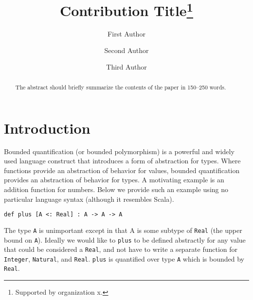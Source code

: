 \documentclass[runningheads]{llncs}
\begin{document}
%
\title{Contribution Title\thanks{Supported by organization x.}}
%
%
\author{First Author \and
Second Author \and
Third Author}
%
%
%
\maketitle              %
%
\begin{abstract}
The abstract should briefly summarize the contents of the paper in
150--250 words.

\end{abstract}

\section{Introduction}
\label{s:intro}

Bounded quantification (or bounded polymorphism) is a powerful and widely used language construct that introduces a form of 
abstraction for types. Where functions provide an abstraction of behavior for values, bounded quantification 
provides an abstraction of behavior for types. A motivating example is an addition function for numbers. Below we
provide such an example using no particular language syntax (although it resembles Scala).
\begin{lstlisting}[mathescape, style=custom_lang]
def plus [A <: Real] : A -> A -> A
\end{lstlisting}
The type \verb|A| is unimportant except in that A is some subtype of \verb|Real| (the upper bound on \verb|A|). Ideally we would like to 
\verb|plus| to be defined abstractly for any value that could be considered a \verb|Real|, and not have to write 
a separate function for \verb|Integer|, \verb|Natural|, and \verb|Real|. \verb|plus| is  quantified over type \verb|A| which is 
bounded by \verb|Real|.
\end{document}
